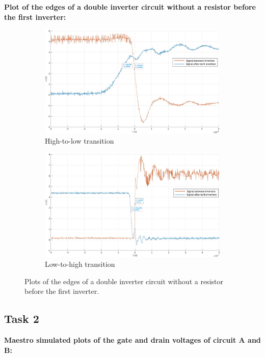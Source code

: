 \documentclass[onecolumn]{article}
\begin{document}
\textbf{Plot of the edges of a double inverter circuit without a resistor before the first inverter:}

\begin{figure}[h!]
  \centering
  \begin{subfigure}{.5\textwidth}
    \centering
    \includegraphics[width=.8\linewidth]{task2bhl2.png}
    \caption{High-to-low transition}
    \label{fig:sub3}
  \end{subfigure}%
  \begin{subfigure}{.5\textwidth}
    \centering
    \includegraphics[width=.8\linewidth]{task2blh2.png}
    \caption{Low-to-high transition}
    \label{fig:sub4}
  \end{subfigure}
  \caption{Plots of the edges of a double inverter circuit without a resistor before the first inverter.}
  \label{fig:2}
\end{figure}

\subsection{Task 2}

\textbf{Maestro simulated plots of the gate and drain voltages of circuit A and B:}
\end{document}
